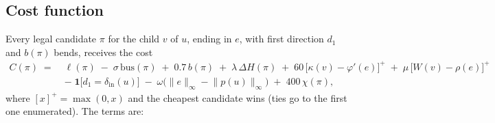 \documentclass[11pt,a4paper]{article}
\theoremstyle{remark}
\newcommand{\pos}{p}
\newcommand{\cheb}[1]{\lVert #1 \rVert_\infty}
\newcommand{\freed}{\varphi}
\begin{document}
\subsection{Cost function}\label{sec:cost}

Every legal candidate $\pi$ for the child $v$ of $u$, ending in $e$, with first direction $d_1$ and $b(\pi)$ bends,
receives the cost
\begin{equation}\label{eq:cost}
\begin{split}
C(\pi)\;=\;& \ell(\pi) \;-\; \sigma\,\mathrm{bus}(\pi) \;+\; 0.7\,b(\pi) \;+\; \lambda\,\Delta H(\pi)
  \;+\; 60\,\bigl[\kappa(v)-\freed'(e)\bigr]^+ \;+\; \mu\,\bigl[W(v)-\rho(e)\bigr]^+\\
 &-\; \mathbf 1\bigl[d_1=\delta_{\mathrm{in}}(u)\bigr] \;-\; \omega\bigl(\cheb{e}-\cheb{\pos(u)}\bigr)
  \;+\; 400\,\chi(\pi),
\end{split}
\end{equation}
where $[x]^+=\max(0,x)$ and the cheapest candidate wins (ties go to the first one enumerated). The terms are:
\end{document}
